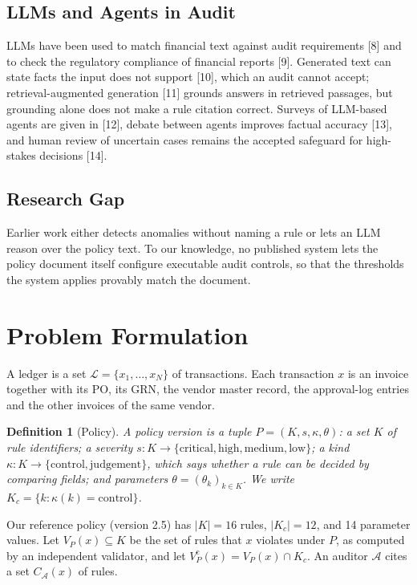 \documentclass[9pt,a4paper,twocolumn]{extarticle}
\newtheorem{definition}{Definition}
\newcommand{\Vc}{V^{\mathrm{c}}}
\begin{document}
\subsection{LLMs and Agents in Audit}
LLMs have been used to match financial text against audit requirements [8] and to check the regulatory compliance of financial reports [9]. Generated text can state facts the input does not support [10], which an audit cannot accept; retrieval-augmented generation [11] grounds answers in retrieved passages, but grounding alone does not make a rule citation correct. Surveys of LLM-based agents are given in [12], debate between agents improves factual accuracy [13], and human review of uncertain cases remains the accepted safeguard for high-stakes decisions [14].

\subsection{Research Gap}
Earlier work either detects anomalies without naming a rule or lets an LLM reason over the policy text. To our knowledge, no published system lets the policy document itself configure executable audit controls, so that the thresholds the system applies provably match the document.

\section{Problem Formulation}
\label{sec:formal}
A ledger is a set $\mathcal{L}=\{x_1,\dots,x_N\}$ of transactions. Each transaction $x$ is an invoice together with its PO, its GRN, the vendor master record, the approval-log entries and the other invoices of the same vendor.

\begin{definition}[Policy]
A policy version is a tuple $P=(K,s,\kappa,\theta)$: a set $K$ of rule identifiers; a severity $s:K\to\{\mathrm{critical},\mathrm{high},\mathrm{medium},\mathrm{low}\}$; a kind $\kappa:K\to\{\mathrm{control},\mathrm{judgement}\}$, which says whether a rule can be decided by comparing fields; and parameters $\theta=(\theta_k)_{k\in K}$. We write $K_c=\{k:\kappa(k)=\mathrm{control}\}$.
\end{definition}

Our reference policy (version 2.5) has $|K|=16$ rules, $|K_c|=12$, and 14 parameter values. Let $V_P(x)\subseteq K$ be the set of rules that $x$ violates under $P$, as computed by an independent validator, and let $\Vc_P(x)=V_P(x)\cap K_c$. An auditor $\mathcal{A}$ cites a set $C_{\mathcal{A}}(x)$ of rules.
\end{document}
